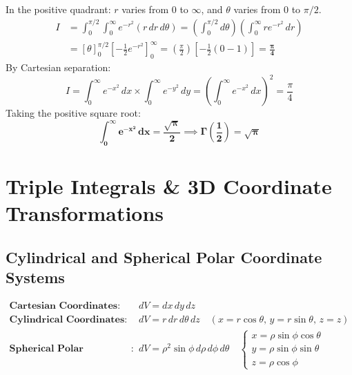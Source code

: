 \begin{solutionbox}
In the positive quadrant: $r$ varies from $0$ to $\infty$, and $\theta$ varies from $0$ to $\pi/2$.
\begin{align*}
    I &= \int_0^{\pi/2} \int_0^\infty e^{-r^2} (r\,dr\,d\theta) = \left(\int_0^{\pi/2} d\theta\right) \left(\int_0^\infty r e^{-r^2}\,dr\right) \\
    &= [\theta]_0^{\pi/2} \left[ -\frac{1}{2} e^{-r^2} \right]_0^\infty = \left(\frac{\pi}{2}\right) \left[ -\frac{1}{2}(0 - 1) \right] = \mathbf{\frac{\pi}{4}}
\end{align*}
By Cartesian separation:
\begin{equation*}
    I = \int_0^\infty e^{-x^2}\,dx \times \int_0^\infty e^{-y^2}\,dy = \left(\int_0^\infty e^{-x^2}\,dx\right)^2 = \frac{\pi}{4}
\end{equation*}
Taking the positive square root:
\begin{equation*}
    \mathbf{\int_0^\infty e^{-x^2}\,dx = \frac{\sqrt{\pi}}{2}} \implies \mathbf{\Gamma\left(\frac{1}{2}\right) = \sqrt{\pi}}
\end{equation*}
\end{solutionbox}

\section{Triple Integrals \& 3D Coordinate Transformations}

\subsection{Cylindrical and Spherical Polar Coordinate Systems}

\begin{keyequation}
\begin{align}
    \textbf{Cartesian Coordinates}: \quad & dV = dx\,dy\,dz \\
    \textbf{Cylindrical Coordinates}: \quad & dV = r\,dr\,d\theta\,dz \quad (x = r\cos\theta, \, y = r\sin\theta, \, z = z) \\
    \textbf{Spherical Polar Coordinates}: \quad & dV = \rho^2 \sin\phi\,d\rho\,d\phi\,d\theta \quad \begin{cases} x = \rho\sin\phi\cos\theta \\ y = \rho\sin\phi\sin\theta \\ z = \rho\cos\phi \end{cases}
\end{align}
\end{keyequation}

